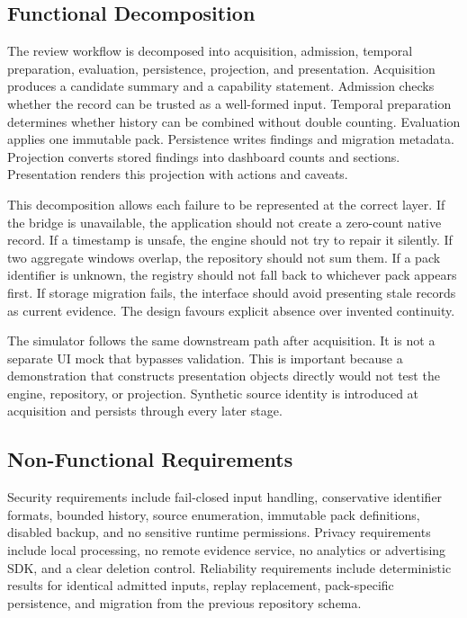 \subsection{Functional Decomposition}

The review workflow is decomposed into acquisition, admission, temporal preparation, evaluation, persistence, projection, and presentation. Acquisition produces a candidate summary and a capability statement. Admission checks whether the record can be trusted as a well-formed input. Temporal preparation determines whether history can be combined without double counting. Evaluation applies one immutable pack. Persistence writes findings and migration metadata. Projection converts stored findings into dashboard counts and sections. Presentation renders this projection with actions and caveats.

This decomposition allows each failure to be represented at the correct layer. If the bridge is unavailable, the application should not create a zero-count native record. If a timestamp is unsafe, the engine should not try to repair it silently. If two aggregate windows overlap, the repository should not sum them. If a pack identifier is unknown, the registry should not fall back to whichever pack appears first. If storage migration fails, the interface should avoid presenting stale records as current evidence. The design favours explicit absence over invented continuity.

The simulator follows the same downstream path after acquisition. It is not a separate UI mock that bypasses validation. This is important because a demonstration that constructs presentation objects directly would not test the engine, repository, or projection. Synthetic source identity is introduced at acquisition and persists through every later stage.

\subsection{Non-Functional Requirements}

Security requirements include fail-closed input handling, conservative identifier formats, bounded history, source enumeration, immutable pack definitions, disabled backup, and no sensitive runtime permissions. Privacy requirements include local processing, no remote evidence service, no analytics or advertising SDK, and a clear deletion control. Reliability requirements include deterministic results for identical admitted inputs, replay replacement, pack-specific persistence, and migration from the previous repository schema.

